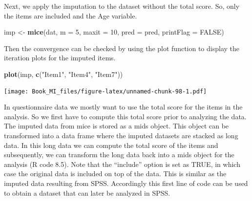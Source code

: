 \documentclass[]{book}
\newenvironment{Shaded}{\begin{snugshade}}{\end{snugshade}}
\newcommand{\KeywordTok}[1]{\textcolor[rgb]{0.13,0.29,0.53}{\textbf{#1}}}
\newcommand{\DataTypeTok}[1]{\textcolor[rgb]{0.13,0.29,0.53}{#1}}
\newcommand{\DecValTok}[1]{\textcolor[rgb]{0.00,0.00,0.81}{#1}}
\newcommand{\StringTok}[1]{\textcolor[rgb]{0.31,0.60,0.02}{#1}}
\newcommand{\OtherTok}[1]{\textcolor[rgb]{0.56,0.35,0.01}{#1}}
\newcommand{\OperatorTok}[1]{\textcolor[rgb]{0.81,0.36,0.00}{\textbf{#1}}}
\newcommand{\NormalTok}[1]{#1}
\begin{document}
Next, we apply the imputation to the dataset without the total score.
So, only the items are included and the Age variable.

\begin{Shaded}
\begin{Highlighting}[]
\NormalTok{imp <-}\StringTok{ }\KeywordTok{mice}\NormalTok{(dat, }\DataTypeTok{m =} \DecValTok{5}\NormalTok{, }\DataTypeTok{maxit =} \DecValTok{10}\NormalTok{, }\DataTypeTok{pred =}\NormalTok{ pred, }\DataTypeTok{printFlag =} \OtherTok{FALSE}\NormalTok{)}
\end{Highlighting}
\end{Shaded}

Then the convergence can be checked by using the plot function to
display the iteration plots for the imputed items.

\begin{Shaded}
\begin{Highlighting}[]
\KeywordTok{plot}\NormalTok{(imp, }\KeywordTok{c}\NormalTok{(}\StringTok{"Item1"}\NormalTok{, }\StringTok{"Item4"}\NormalTok{, }\StringTok{"Item7"}\NormalTok{))}
\end{Highlighting}
\end{Shaded}

\texttt{[image: Book\_MI\_files/figure-latex/unnamed-chunk-98-1.pdf]}

In questionnaire data we mostly want to use the total score for the
items in the analysis. So we first have to compute this total score
prior to analyzing the data. The imputed data from mice is stored as a
mids object. This object can be transformed into a data frame where the
imputed datasets are stacked as long data. In this long data we can
compute the total score of the items and subsequently, we can transform
the long data back into a mids object for the analysis (R code 8.5).
Note that the ``include'' option is set as TRUE, in which case the
original data is included on top of the data. This is similar as the
imputed data resulting from SPSS. Accordingly this first line of code
can be used to obtain a dataset that can later be analyzed in SPSS.

\begin{Shaded}
\end{Shaded}
\end{document}
